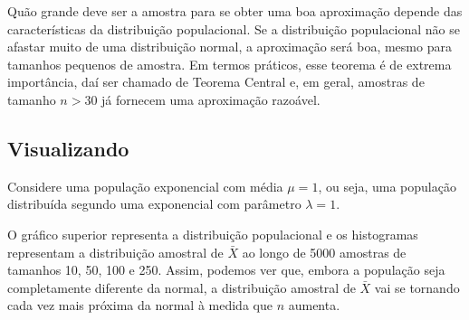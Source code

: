 \documentclass[
]{book}
\begin{document}
Quão grande deve ser a amostra para se obter uma boa aproximação depende das características da distribuição populacional. Se a distribuição populacional não se afastar muito de uma distribuição normal, a aproximação será boa, mesmo para tamanhos pequenos de amostra. Em termos práticos, esse teorema é de extrema importância, daí ser chamado de Teorema Central e, em geral, amostras de tamanho \(n>30\) já fornecem uma aproximação razoável.

\hypertarget{visualizando-1}{%
\subsection{Visualizando}\label{visualizando-1}}

Considere uma população exponencial com média \(\mu=1\), ou seja, uma população distribuída segundo uma exponencial com parâmetro \(\lambda=1\).

O gráfico superior representa a distribuição populacional e os histogramas representam a distribuição amostral de \(\bar X\) ao longo de 5000 amostras de tamanhos 10, 50, 100 e 250. Assim, podemos ver que, embora a população seja completamente diferente da normal, a distribuição amostral de \(\bar X\) vai se tornando cada vez mais próxima da normal à medida que \(n\) aumenta.
\end{document}
